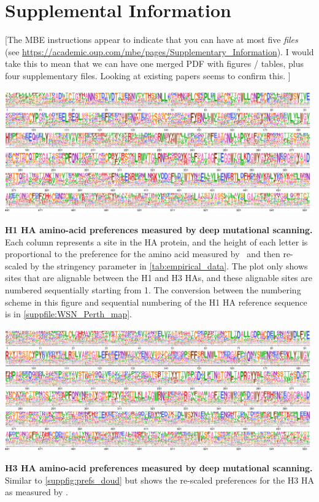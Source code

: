 \documentclass[11pt]{article}
\newcommand\jdbcomment[1]{{\color{red}[#1]}}
\begin{document}
\clearpage 



\newpage
\section*{Supplemental Information}

\jdbcomment{The MBE instructions appear to indicate that you can have at most five \emph{files} (see \url{https://academic.oup.com/mbe/pages/Supplementary_Information}). 
I would take this to mean that we can have one merged PDF with figures / tables, plus four supplementary files.
Looking at existing papers seems to confirm this.
}


\begin{suppfig}[H]
\centerline{\includegraphics[width=\textwidth]{figures/prefs_doud}}
\caption{\label{suppfig:prefs_doud}
\textbf{H1 HA amino-acid preferences measured by deep mutational scanning.}
Each column represents a site in the HA protein, and the height of each letter is proportional to the preference for the amino acid measured by~\citet{doud2016accurate} and then re-scaled by the stringency parameter in \ref{tab:empirical_data}. 
The plot only shows sites that are alignable between the H1 and H3 HAs, and these alignable sites are numbered sequentially starting from 1.
The conversion between the numbering scheme in this figure and sequential numbering of the H1 HA reference sequence is in \ref{suppfile:WSN_Perth_map}. 
}
\end{suppfig}
\clearpage 


\begin{suppfig}[H]
\centerline{\includegraphics[width=\textwidth]{figures/prefs_lee}}
\caption{\label{suppfig:prefs_lee}
\textbf{H3 HA amino-acid preferences measured by deep mutational scanning.}
Similar to \ref{suppfig:prefs_doud} but shows the re-scaled preferences for the H3 HA as measured by \citet{lee2018deep}.
 }
\end{suppfig}
\clearpage 
\end{document}
